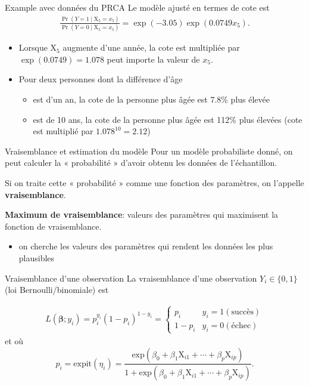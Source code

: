 \documentclass[
  ignorenonframetext,
]{beamer}
\providecommand{\tightlist}{%
  \setlength{\itemsep}{0pt}\setlength{\parskip}{0pt}}\usepackage{longtable,booktabs,array}
\begin{document}
\begin{frame}{Example avec données du PRCA}
\protect\hypertarget{example-avec-donnuxe9es-du-prca}{}
Le modèle ajusté en termes de cote est \begin{align*}
 \frac{\Pr(Y=1 \mid \mathrm{X}_5=x_5)}{\Pr(Y=0 \mid \mathrm{X}_5=x_5)} = \exp(-3.05)\exp(0.0749x_5).
\end{align*}

\small

\begin{itemize}
\tightlist
\item
  Lorsque \(\mathrm{X}_5\) augmente d'une année, la cote est multipliée
  par \(\exp(0.0749) = 1.078\) peut importe la valeur de \(x_5\).
\item
  Pour deux personnes dont la différence d'âge

  \begin{itemize}
  \tightlist
  \item
    est d'un an, la cote de la personne plus âgée est 7.8\% plus élevée
  \item
    est de 10 ans, la cote de la personne plus âgée est 112\% plus
    élevées (cote est multiplié par \(1.078^{10} = 2.12\))
  \end{itemize}
\end{itemize}

\normalsize
\end{frame}

\begin{frame}{Vraisemblance et estimation du modèle}
\protect\hypertarget{vraisemblance-et-estimation-du-moduxe8le}{}
Pour un modèle probabiliste donné, on peut calculer la « probabilité »
d'avoir obtenu les données de l'échantillon.

Si on traite cette « probabilité » comme une fonction des paramètres, on
l'appelle \textbf{vraisemblance}.

\textbf{Maximum de vraisemblance}: valeurs des paramètres qui maximisent
la fonction de vraisemblance.

\begin{itemize}
\tightlist
\item
  on cherche les valeurs des paramètres qui rendent les données les plus
  plausibles
\end{itemize}
\end{frame}

\begin{frame}{Vraisemblance d'une observation}
\protect\hypertarget{vraisemblance-dune-observation}{}
La vraisemblance d'une observation \(Y_i \in \{0,1\}\) (loi
Bernoulli/binomiale) est

\begin{align*}
L(\boldsymbol{\beta}; y_i) = p_i^{y_i}(1-p_i)^{1-y_i} = \begin{cases} 
p_i & y_i = 1 (\text{succès})\\
1-p_i & y_i = 0 (\text{échec}) 
\end{cases}
\end{align*} et où
\[p_i = \mathrm{expit}(\eta_i) = \frac{\mathrm{exp}(\beta_0 + \beta_1 \mathrm{X}_{i1} + \cdots + \beta_p\mathrm{X}_{ip})}{1+\mathrm{exp}(\beta_0 + \beta_1 \mathrm{X}_{i1} + \cdots + \beta_p\mathrm{X}_{ip})}.\]
\end{frame}
\end{document}
